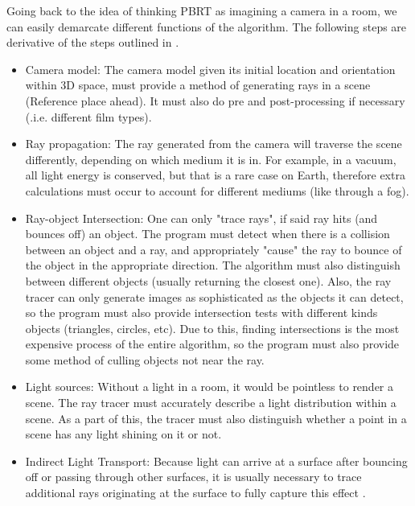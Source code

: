 \documentclass[../main.tex]{subfiles}
\begin{document}
Going back to the idea of thinking PBRT as imagining a camera in a room, we can easily demarcate different functions of the algorithm.
The following steps are derivative of the steps outlined in \cite{pharrPhysicallyBasedRendering2016}.
\begin{itemize}
  \item Camera model: The camera model given its initial location and orientation within 3D space, must provide a method of generating rays in a scene (Reference place ahead). It must also do pre and post-processing if necessary (.i.e. different film types).
  \item Ray propagation: The ray generated from the camera will traverse the scene differently, depending on which medium it is in. For example, in a vacuum, all light energy is conserved, but that is a rare case on Earth, therefore extra calculations must occur to account for different mediums (like through a fog).
  \item Ray-object Intersection: One can only "trace rays", if said ray hits (and bounces off) an object. The program must detect when there is a collision between an object and a ray, and appropriately "cause" the ray to bounce of the object in the appropriate direction.
    The algorithm must also distinguish between different objects (usually returning the closest one). Also, the ray tracer can only generate images as sophisticated as the objects it can detect, so the program must also provide intersection tests with different kinds objects (triangles, circles, etc). Due to this, finding intersections is the most expensive process of the entire algorithm, so the program must also provide some method of culling objects not near the ray.
  \item Light sources: Without a light in a room, it would be pointless to render a scene. The ray tracer must accurately describe a light distribution within a scene. As a part of this, the tracer must also distinguish whether a point in a scene has any light shining on it or not.
  \item Indirect Light Transport: Because light can arrive at a surface after bouncing off or passing through other surfaces, it is usually necessary to trace additional rays originating at the surface to fully capture this effect \cite{pharrPhysicallyBasedRendering2016}. 
\end{itemize}
\end{document}

